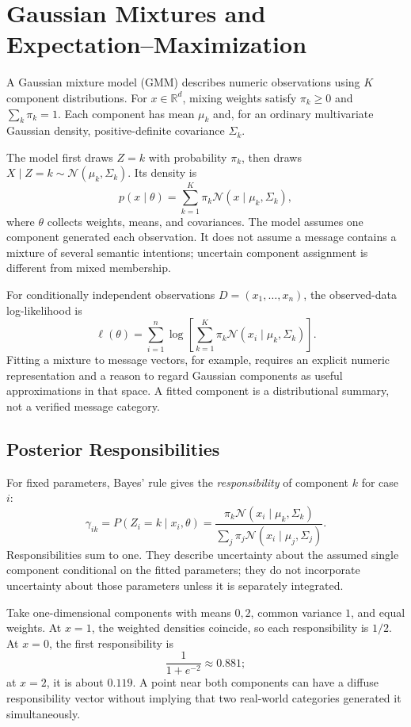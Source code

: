 \section{Gaussian Mixtures and Expectation--Maximization}
\label{sec:gmm-em}

A Gaussian mixture model (GMM) describes numeric observations using $K$ component distributions. For $x\in\mathbb R^d$, mixing weights satisfy $\pi_k\ge0$ and $\sum_k\pi_k=1$. Each component has mean $\mu_k$ and, for an ordinary multivariate Gaussian density, positive-definite covariance $\Sigma_k$.

The model first draws $Z=k$ with probability $\pi_k$, then draws $X\mid Z=k\sim\mathcal N(\mu_k,\Sigma_k)$. Its density is
\[
p(x\mid\theta)=\sum_{k=1}^K\pi_k\mathcal N(x\mid\mu_k,\Sigma_k),
\]
where $\theta$ collects weights, means, and covariances. The model assumes one component generated each observation. It does not assume a message contains a mixture of several semantic intentions; uncertain component assignment is different from mixed membership.

For conditionally independent observations $D=(x_1,\ldots,x_n)$, the observed-data log-likelihood is
\[
\ell(\theta)=\sum_{i=1}^n\log\!\left[\sum_{k=1}^K
\pi_k\mathcal N(x_i\mid\mu_k,\Sigma_k)\right].
\]
Fitting a mixture to message vectors, for example, requires an explicit numeric representation and a reason to regard Gaussian components as useful approximations in that space. A fitted component is a distributional summary, not a verified message category.

\subsection{Posterior Responsibilities}

For fixed parameters, Bayes' rule gives the \emph{responsibility} of component $k$ for case $i$:
\[
\gamma_{ik}=P(Z_i=k\mid x_i,\theta)
=\frac{\pi_k\mathcal N(x_i\mid\mu_k,\Sigma_k)}
{\sum_j\pi_j\mathcal N(x_i\mid\mu_j,\Sigma_j)}.
\]
Responsibilities sum to one. They describe uncertainty about the assumed single component conditional on the fitted parameters; they do not incorporate uncertainty about those parameters unless it is separately integrated.

Take one-dimensional components with means $0,2$, common variance $1$, and equal weights. At $x=1$, the weighted densities coincide, so each responsibility is $1/2$. At $x=0$, the first responsibility is
\[
\frac{1}{1+e^{-2}}\approx0.881;
\]
at $x=2$, it is about $0.119$. A point near both components can have a diffuse responsibility vector without implying that two real-world categories generated it simultaneously.


